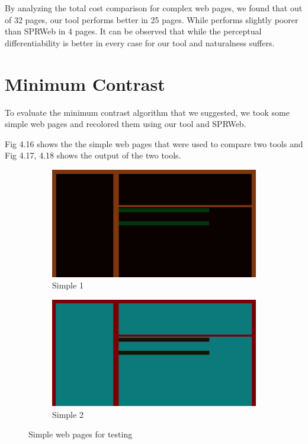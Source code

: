 By analyzing the total cost comparison for complex web pages, we found that out of 32 pages, our tool performs better in 25 pages. While performs slightly poorer than SPRWeb in 4 pages. It can be observed that while the perceptual differentiability is better in every case for our tool and naturalness suffers. 

\section{Minimum Contrast}
\label{Minimum Contrast}

To evaluate the minimum contrast algorithm that we suggested, we took some simple web pages and recolored them using our tool and SPRWeb. 

Fig 4.16 shows the the simple web pages that were used to compare two tools and Fig 4.17, 4.18 shows the output of the two tools. 


\begin{figure}
\centering
\begin{subfigure}{.5\textwidth}
  \centering
  \includegraphics[width=0.9\linewidth]{Original1.png}
  \caption{Simple 1}
  \label{fig:sub1}
\end{subfigure}%
\begin{subfigure}{.5\textwidth}
  \centering
  \includegraphics[width=0.9\linewidth]{Original2.png}
  \caption{Simple 2}
  \label{fig:sub2}
\end{subfigure}
\caption{Simple web pages for testing}
\label{fig:test}
\end{figure}  


